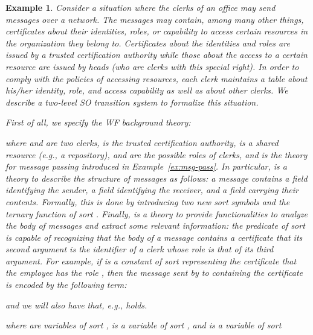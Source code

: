 \documentclass[conference]{IEEEtran}
\newtheorem{example}{Example}
\begin{document}
\begin{example}
  \label{ex:SO-appl}
  Consider a situation where the clerks of an office may send
  messages over a network.  The messages may contain, among many other
  things, certificates about their identities, roles, or capability to
  access certain resources in the organization they belong to.
  Certificates about the identities and roles are issued by a trusted
  certification authority while those about the access to a certain
  resource are issued by heads (who are clerks with this special
  right).  In order to comply with the policies of accessing
  resources, each clerk maintains a table about his/her identity,
  role, and access capability as well as about other clerks.  We
  describe a two-level SO transition system to formalize this
  situation.  

  First of all, we specify the WF background theory:
  
  where  and  are two clerks,
   is the trusted certification authority, 
  is a shared resource (e.g., a repository),  and
   are the possible roles of clerks, and
   is the theory for message passing
  introduced in Example~\ref{ex:msg-pass}.  In particular,
   is a theory to describe the structure of messages as
  follows: a message contains a field identifying the sender, a field
  identifying the receiver, and a field carrying their contents.
  Formally, this is done by introducing two new sort symbols
   and the ternary function  of sort
  .  Finally,  is a theory to provide
  functionalities to analyze the body of messages and extract some
  relevant information: the predicate  of
  sort  is
  capable of recognizing that the body of a message contains a
  certificate that its second argument is the identifier of a clerk
  whose role is that of its third argument.  For example, if
   is a constant of sort 
  representing the certificate that the employee  has the
  role , then the message sent by  to
   containing the certificate
   is encoded by the following term:
  
  and we will also have that, e.g., 
   holds.

  \begin{figure*}[t]
  
  \centerline{where  are variables of sort
    ,  is a variable of sort , and 
    is a variable of sort }
  \caption{\label{fig:transition-example3}A formalization of the interplay between WF and PM levels by a guarded assignment transition (cf.\ Example~\ref{ex:SO-appl})}
  \end{figure*}


\end{example}
\end{document}
